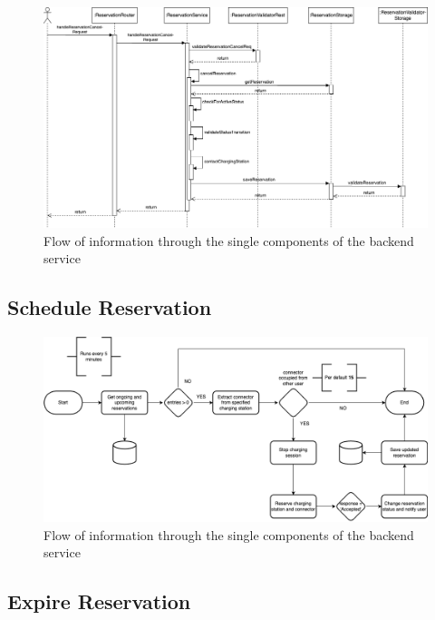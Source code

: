 \begin{figure}[!ht]
    \centering
    \includegraphics[scale=0.4]{resources/images/main/6_implementation/ReservationCancel.png}
    \caption{Flow of information through the single components of the backend service}
    \label{fig:cancel-reservation-seq-flow}
\end{figure}

\subsection{Schedule Reservation}
\label{ch:Implementation:sec:Implemented Use Cases:ssec:Schedule Reservation}


\begin{figure}[!ht]
    \centering
    \includegraphics[scale=0.4]{resources/images/main/6_implementation/scheduler/SynchronizeReservation.png}
    \caption{Flow of information through the single components of the backend service}
    \label{fig:schedule-reservation-flow}
\end{figure}

\subsection{Expire Reservation}
\label{ch:Implementation:sec:Implemented Use Cases:ssec:Expire Reservation}

